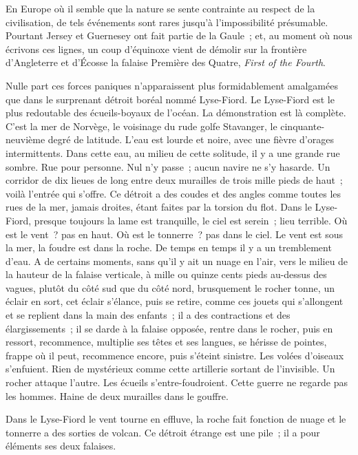\documentclass[french,twoside]{book} %
\begin{document}
En Europe où il semble que la nature se sente contrainte au respect de la civilisation, de tels événements sont rares jusqu’à l’impossibilité présumable. Pourtant Jersey et Guernesey ont fait partie de la Gaule ; et, au moment où nous écrivons ces lignes, un coup d’équinoxe vient de démolir sur la frontière d’Angleterre et d’Écosse la falaise Première des Quatre, \emph{First of the Fourth}.\par
Nulle part ces forces paniques n’apparaissent plus formidablement amalgamées que dans le surprenant détroit boréal nommé Lyse-Fiord. Le Lyse-Fiord est  le plus redoutable des écueils-boyaux de l’océan. La démonstration est là complète. C’est la mer de Norvège, le voisinage du rude golfe Stavanger, le cinquante-neuvième degré de latitude. L’eau est lourde et noire, avec une fièvre d’orages intermittents. Dans cette eau, au milieu de cette solitude, il y a une grande rue sombre. Rue pour personne. Nul n’y passe ; aucun navire ne s’y hasarde. Un corridor de dix lieues de long entre deux murailles de trois mille pieds de haut ; voilà l’entrée qui s’offre. Ce détroit a des coudes et des angles comme toutes les rues de la mer, jamais droites, étant faites par la torsion du flot. Dans le Lyse-Fiord, presque toujours la lame est tranquille, le ciel est serein ; lieu terrible. Où est le vent ? pas en haut. Où est le tonnerre ? pas dans le ciel. Le vent est sous la mer, la foudre est dans la roche. De temps en temps il y a un tremblement d’eau. A de certains moments, sans qu’il y ait un nuage en l’air, vers le milieu de la hauteur de la falaise verticale, à mille ou quinze cents pieds au-dessus des vagues, plutôt du côté sud que du côté nord, brusquement le rocher tonne, un éclair en sort, cet éclair s’élance, puis se retire, comme ces jouets qui s’allongent et se replient dans la main des enfants ; il a des contractions et des élargissements ; il se darde à la falaise opposée, rentre dans le rocher, puis en ressort, recommence, multiplie ses têtes et ses langues, se hérisse de pointes, frappe où il peut, recommence encore, puis s’éteint sinistre. Les volées d’oiseaux s’enfuient. Rien de mystérieux comme cette artillerie sortant de l’invisible. Un rocher attaque l’autre.  Les écueils s’entre-foudroient. Cette guerre ne regarde pas les hommes. Haine de deux murailles dans le gouffre.\par
Dans le Lyse-Fiord le vent tourne en effluve, la roche fait fonction de nuage et le tonnerre a des sorties de volcan. Ce détroit étrange est une pile ; il a pour éléments ses deux falaises.
\end{document}
